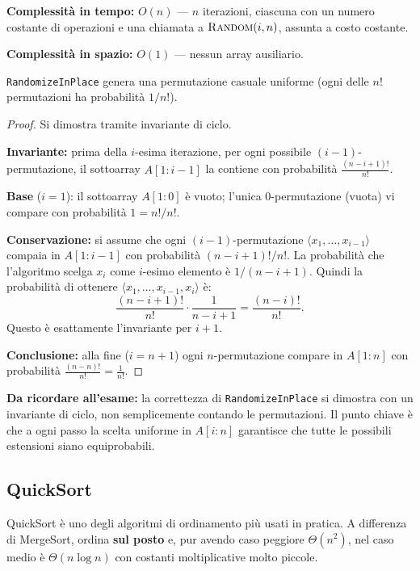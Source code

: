 \textbf{Complessità in tempo:} $O(n)$ — $n$ iterazioni, ciascuna con un
numero costante di operazioni e una chiamata a $\textsc{Random}(i,n)$,
assunta a costo costante.

\textbf{Complessità in spazio:} $O(1)$ — nessun array ausiliario.

\begin{lemma}
	\texttt{RandomizeInPlace} genera una permutazione casuale uniforme
	(ogni delle $n!$ permutazioni ha probabilità $1/n!$).
\end{lemma}
\begin{proof}
	Si dimostra tramite invariante di ciclo.
	
	\textbf{Invariante:} prima della $i$-esima iterazione, per ogni
	possibile $(i-1)$-permutazione, il sottoarray $A[1:i-1]$ la
	contiene con probabilità $\frac{(n-i+1)!}{n!}$.
	
	\textbf{Base} ($i=1$): il sottoarray $A[1:0]$ è vuoto;
	l'unica 0-permutazione (vuota) vi compare con probabilità
	$1 = n!/n!$. \checkmark
	
	\textbf{Conservazione:} si assume che ogni $(i-1)$-permutazione
	$\langle x_1,\ldots,x_{i-1}\rangle$ compaia in $A[1:i-1]$
	con probabilità $(n-i+1)!/n!$.
	La probabilità che l'algoritmo scelga $x_i$ come $i$-esimo
	elemento è $1/(n-i+1)$. Quindi la probabilità di ottenere
	$\langle x_1,\ldots,x_{i-1},x_i\rangle$ è:
	\[
	\frac{(n-i+1)!}{n!}\cdot\frac{1}{n-i+1}
	= \frac{(n-i)!}{n!}.
	\]
	Questo è esattamente l'invariante per $i+1$. \checkmark
	
	\textbf{Conclusione:} alla fine ($i=n+1$) ogni $n$-permutazione
	compare in $A[1:n]$ con probabilità
	$\frac{(n-n)!}{n!} = \frac{1}{n!}$.
\end{proof}
\begin{hardnote}
	
	\textbf{Da ricordare all'esame:} la correttezza di
	\texttt{RandomizeInPlace} si dimostra con un invariante di ciclo,
	non semplicemente contando le permutazioni. Il punto chiave è che
	a ogni passo la scelta uniforme in $A[i:n]$ garantisce che tutte
	le possibili estensioni siano equiprobabili.
\end{hardnote}

\subsection{QuickSort}

\begin{softnote}
	QuickSort è uno degli algoritmi di ordinamento più usati in pratica.
	A differenza di MergeSort, ordina \textbf{sul posto} e, pur avendo
	caso peggiore $\Theta(n^2)$, nel caso medio è $\Theta(n \log n)$
	con costanti moltiplicative molto piccole.
\end{softnote}

